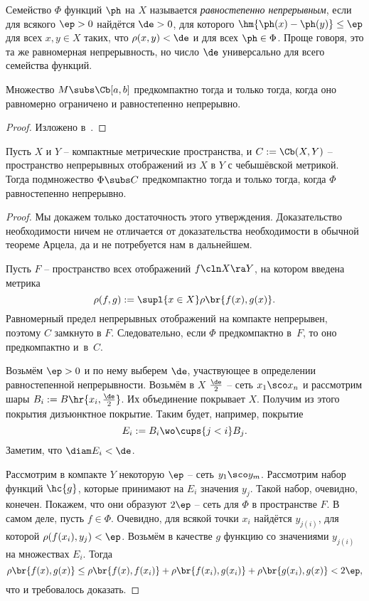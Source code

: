 \documentclass[a4paper]{article}
\begin{document}
\begin{df}
Семейство $\Phi$ функций $\ph$ на $X$ называется \emph{равностепенно непрерывным},
если для всякого $\ep > 0$ найдётся $\de > 0$, для которого
$\hm{\ph(x) - \ph(y)} \le \ep$ для всех $x, y \in X$ таких, что $\rho(x,y) < \de$ и для
всех $\ph \in \Phi$. Проще говоря, это та же равномерная непрерывность,
но число $\de$ универсально для всего семейства функций.
\end{df}

\begin{theorem}
Множество $M \subs \Cb[a,b]$ предкомпактно тогда и только тогда, когда
оно равномерно ограничено и равностепенно непрерывно.
\end{theorem}
\begin{proof}
Изложено в~\cite[гл.~II, \S~7, п.~4]{kf}.
\end{proof}

\begin{theorem}
Пусть $X$ и $Y$ -- компактные метрические
пространства, и $C := \Cb(X,Y)$ -- пространство непрерывных
отображений из $X$ в $Y$ с чебышёвской метрикой. Тогда подмножество
$\Phi \subs C$ предкомпактно тогда и только тогда,
когда $\Phi$ равностепенно непрерывно.
\end{theorem}
\begin{proof}
Мы докажем только достаточность этого утверждения. Доказательство необходимости
ничем не отличается от доказательства необходимости в обычной теореме Арцела,
да и не потребуется нам в дальнейшем.

Пусть $F$ -- пространство всех отображений $f\cln X \ra Y$, на котором введена метрика
$$\rho(f,g) := \supl{x \in X} \rho\br{f(x), g(x)}.$$
Равномерный предел непрерывных отображений на компакте непрерывен, поэтому $C$ замкнуто в $F$.
Следовательно, если $\Phi$ предкомпактно в~$F$, то оно предкомпактно и~в~$C$.

Возьмём $\ep > 0$ и по нему выберем $\de$, участвующее в определении
равностепенной непрерывности. Возьмём в $X$ $\frac{\de}{2}$ -- сеть $x_1\sco x_n$
и рассмотрим шары $B_i := B\hr{x_i, \frac{\de}{2}}$. Их объединение покрывает $X$.
Получим из этого покрытия дизъюнктное покрытие. Таким будет, например, покрытие
$$E_i := B_i \wo \cups{j < i} B_j.$$
Заметим, что $\diam E_i < \de$.

Рассмотрим в компакте $Y$ некоторую $\ep$ -- сеть $y_1\sco y_m$. Рассмотрим набор функций
$\hc{g}$, которые принимают на $E_i$ значения $y_j$. Такой набор, очевидно, конечен.
Покажем, что они образуют $2\ep$ -- сеть для $\Phi$ в пространстве $F$. В самом деле,
пусть $f \in \Phi$. Очевидно, для всякой точки $x_i$ найдётся $y_{j(i)}$, для которой
$\rho(f(x_i), y_j) < \ep$. Возьмём в качестве $g$ функцию со значениями $y_{j(i)}$ на множествах $E_i$.
Тогда
$$\rho\br{f(x),g(x)} \le \rho\br{f(x),f(x_i)} + \rho\br{f(x_i),g(x_i)} + \rho\br{g(x_i),g(x)} < 2\ep,$$
что и требовалось доказать.
\end{proof}
\end{document}
